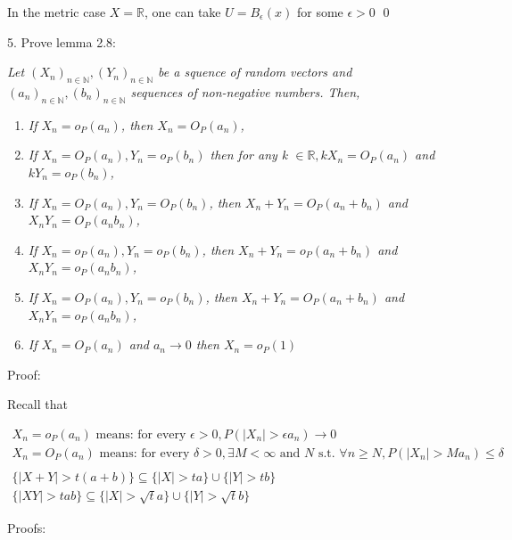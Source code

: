\documentclass[10pt]{article}
\begin{document}
In the metric case $X = \mathbb{R}$, one can take $U = B_\epsilon(x)$ for some $\epsilon > 0$ \qed

5. Prove lemma 2.8:

\textit{Let $(X_n)_{n \in \mathbb{N}}, (Y_n)_{n \in \mathbb{N}}$ be a squence of random vectors and $(a_n)_{n \in \mathbb{N}}, (b_n)_{n \in \mathbb{N}}$ sequences of non-negative numbers. Then,}

\begin{enumerate}[label=\textit{(\roman*)}]
    \item \textit{If $X_n = o_P(a_n)$, then $X_n = O_P(a_n)$,}
    \item \textit{If $X_n = O_P(a_n), Y_n = o_P(b_n)$ then for any k $\in \mathbb{R}, kX_n = O_P(a_n)$ and $kY_n = o_P(b_n)$,}
    \item \textit{If $X_n = O_P(a_n), Y_n = O_P(b_n)$, then $X_n + Y_n = O_P(a_n + b_n)$ and $X_nY_n = O_P(a_nb_n)$,}
    \item \textit{If $X_n = o_P(a_n), Y_n = o_P(b_n)$, then $X_n + Y_n = o_P(a_n + b_n)$ and $X_nY_n = o_P(a_nb_n)$,}
    \item \textit{If $X_n = O_P(a_n), Y_n = o_P(b_n)$, then $X_n + Y_n = O_P(a_n + b_n)$ and $X_nY_n = o_P(a_nb_n)$,}
    \item \textit{If $X_n = O_P(a_n)$ and $a_n \to 0$ then $X_n = o_P(1)$}
\end{enumerate}

Proof: 

Recall that 

\begin{gather*}
    X_n = o_P(a_n) \text{ means: for every } \epsilon > 0, P(|X_n| > \epsilon a_n) \to 0 \\
    X_n = O_P(a_n) \text{ means: for every }\delta > 0, \exists M < \infty \text{ and } N \text{ s.t. } \forall n \geq N, P(|X_n| > M a_n) \leq \delta\\
    \\
    \{|X + Y| > t(a+b)\} \subseteq \{|X| > t a\} \cup \{|Y| > t b\}\\
    \{|X Y| > tab\} \subseteq \{|X| > \sqrt{t} a\} \cup \{|Y| > \sqrt{t} b\}
\end{gather*}

Proofs:
\end{document}
